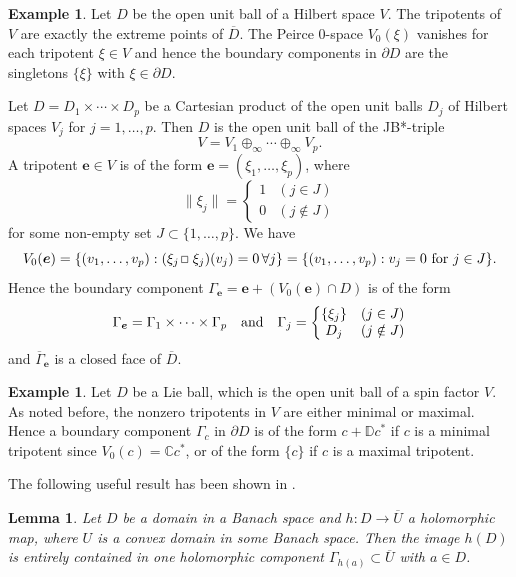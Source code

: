 \documentclass[12pt, twoside]{article}
\def\sqr#1#2{{\,\vcenter{\vbox{\hrule height.#2pt\hbox{\vrule width.#2pt
height#1pt \kern#1pt\vrule width.#2pt}\hrule height.#2pt}}\,}}
\def\bo{\sqr44\,}
\newtheorem{lemma}[theorem]{Lemma}
\theoremstyle{definition}
\newtheorem{example}[theorem]{Example}
\newtheorem*{xexam}{Example}
\numberwithin{equation}{section}
\begin{document}
\begin{example}\label{bergph1} Let $D$ be the open unit ball of a Hilbert space $V$.
The tripotents of  $V$ are exactly the extreme points of
$\overline D$. The Peirce $0$-space $V_0(\xi)$ vanishes for each tripotent $\xi\in V$ and hence
the boundary components in $\partial D$ are the singletons $\{\xi\}$ with $\xi\in \partial D$.

Let $D=D_1 \times \cdots\times D_p$ be a Cartesian product of the open unit balls $D_j$ of
Hilbert spaces $V_j$
for $j=1, \ldots, p$. Then $D$ is the open unit ball of the JB*-triple
$$V= V_1 \oplus_{\infty} \cdots \oplus_{\infty} V_p.$$
A tripotent $\boldsymbol e \in V$ is of the form $\boldsymbol e=(\xi_1, \ldots, \xi_p)$,
 where
$$\|\xi_j\| = \left\{\begin{matrix} 1 & (j\in J)\\
    0 & (j\notin J) \end{matrix}\right. $$
for some non-empty set $J \subset \{1, \ldots, p\}$.
We have
$$V_0(\boldsymbol e) =\{(v_1, \ldots, v_p): (\xi_j \bo \xi_j)(v_j)=0\,  \forall j\}=\{(v_1, \ldots, v_p): v_j=0 ~{\rm for}~
j\in J\}.$$
Hence the boundary component
 $\Gamma_{\boldsymbol e} = \boldsymbol e+ (V_0(\boldsymbol e) \cap D)$ is of the form
 $$\Gamma_{\boldsymbol e}  =  \Gamma_1 \times \cdots \times  \Gamma_p
 \quad {\rm and} \quad \Gamma_j = \left\{\begin{matrix} \{\xi_j\} & (j\in J)\\
 D_j & (j \notin J) \end{matrix} \right. $$
and $\overline{\Gamma}_{\boldsymbol e}$ is a closed face of $\overline D$.
\end{example}

\begin{xexam} Let $D$ be a Lie ball, which is the open unit ball of a spin factor $V$. As noted before,
the nonzero tripotents in $V$ are either minimal or maximal. Hence a boundary component
$\Gamma_c$ in $\partial D$ is of the form $c + \mathbb{D}c^*$ if $c$ is a minimal tripotent
since $V_0(c)=\mathbb{C}c^*$, or of the form $\{c\}$ if $c$ is a maximal tripotent.
\end{xexam}



The following useful result has been shown in \cite[Lemma 3.4.11]{book2}.

\begin{lemma}\label{3.2} Let $D$ be a domain in a Banach space and $h: D \longrightarrow \overline U$  a
holomorphic map, where $U$ is a convex domain in some Banach space. Then the image $h(D)$ is entirely contained  in
one holomorphic component $\Gamma_{h(a)}\subset \overline U$ with $a\in D$.
\end{lemma}
\end{document}

